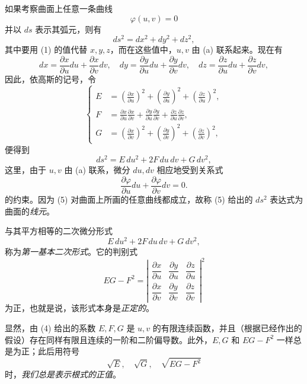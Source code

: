 如果考察曲面上任意一条曲线
\begin{equation}\tag{a}
 \varphi(u,v)=0
\end{equation}
并以 \(ds\) 表示其弧元，则有
\[
 ds^2=dx^2+dy^2+dz^2,
\]
其中要用 (1) 的值代替 \(x,y,z\)，而在这些值中，\(u,v\) 由 (a) 联系起来。现在有
\[
 dx=\frac{\partial x}{\partial u}du+\frac{\partial x}{\partial v}dv,
 \quad
 dy=\frac{\partial y}{\partial u}du+\frac{\partial y}{\partial v}dv,
 \quad
 dz=\frac{\partial z}{\partial u}du+\frac{\partial z}{\partial v}dv,
\]
因此，依高斯的记号，令
\begin{equation}\tag{4}
\left\{
\begin{aligned}
E&=\left(\frac{\partial x}{\partial u}\right)^2+
\left(\frac{\partial y}{\partial u}\right)^2+
\left(\frac{\partial z}{\partial u}\right)^2,\\
F&=\frac{\partial x}{\partial u}\frac{\partial x}{\partial v}+
\frac{\partial y}{\partial u}\frac{\partial y}{\partial v}+
\frac{\partial z}{\partial u}\frac{\partial z}{\partial v},\\
G&=\left(\frac{\partial x}{\partial v}\right)^2+
\left(\frac{\partial y}{\partial v}\right)^2+
\left(\frac{\partial z}{\partial v}\right)^2,
\end{aligned}
\right.
\end{equation}
便得到
\begin{equation}\tag{5}
 ds^2=E\,du^2+2F\,du\,dv+G\,dv^2,
\end{equation}
这里，由于 \(u,v\) 由 (a) 联系，微分 \(du,dv\) 相应地受到关系式
\[
 \frac{\partial\varphi}{\partial u}du+\frac{\partial\varphi}{\partial v}dv=0.
\]
的约束。因为 (5) 对曲面上所画的任意曲线都成立，故称 (5) 给出的 \(ds^2\) 表达式为曲面的\emph{线元}。

与其平方相等的二次微分形式
\[
 E\,du^2+2F\,du\,dv+G\,dv^2,
\]
称为\emph{第一基本二次形式}。它的判别式
\[
 EG-F^2=\left|
\begin{matrix}
\dfrac{\partial x}{\partial u}&\dfrac{\partial y}{\partial u}&\dfrac{\partial z}{\partial u}\\[0.5em]
\dfrac{\partial x}{\partial v}&\dfrac{\partial y}{\partial v}&\dfrac{\partial z}{\partial v}
\end{matrix}\right|^2
\]
为正，也就是说，该形式本身是\emph{正定的}。

显然，由 (4) 给出的系数 \(E,F,G\) 是 \(u,v\) 的有限连续函数，并且（根据已经作出的假设）存在同样有限且连续的一阶和二阶偏导数。此外，\(E,G\) 和 \(EG-F^2\) 一样总是为正；此后用符号
\[
 \sqrt E,
 \quad \sqrt G,
 \quad \sqrt{EG-F^2}
\]
时，\emph{我们总是表示根式的正值}。

